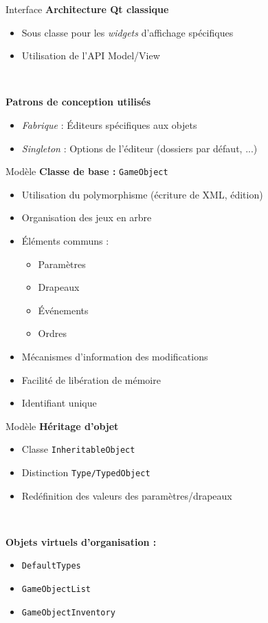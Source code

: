 \documentclass[11pt]{beamer}
\begin{document}
\begin{frame}{Interface}
	\textbf{Architecture Qt classique}
	\begin{itemize}
		\item Sous classe pour les \textit{widgets} d'affichage spécifiques
		\item Utilisation de l'API Model/View
	\end{itemize}
	
	~
	
	\textbf{Patrons de conception utilisés}
	\begin{itemize}
		\item \textit{Fabrique} : Éditeurs spécifiques aux objets
		\item \textit{Singleton} : Options de l'éditeur (dossiers par défaut, ...)
	\end{itemize}
\end{frame}


\begin{frame}{Modèle}
	\textbf{Classe de base : } \texttt{GameObject} 
	\begin{itemize}
		\item Utilisation du polymorphisme (écriture de XML, édition)
		\item Organisation des jeux en arbre
		\item Éléments communs : 
		\begin{itemize}
			\item Paramètres
			\item Drapeaux
			\item Événements
			\item Ordres
		\end{itemize}
		\item Mécanismes d'information des modifications
		\item Facilité de libération de mémoire
		\item Identifiant unique
	\end{itemize}
\end{frame}

\begin{frame}{Modèle}
	\textbf{Héritage d'objet}
	\begin{itemize}
		\item Classe \texttt{InheritableObject}
		\item Distinction \texttt{Type/TypedObject}
		\item Redéfinition des valeurs des paramètres/drapeaux
	\end{itemize}
	
	~
	
	\textbf{Objets virtuels d'organisation :}
	\begin{itemize}
		\item \texttt{DefaultTypes}
		\item \texttt{GameObjectList}
		\item \texttt{GameObjectInventory}
	\end{itemize}
\end{frame}
\end{document}
